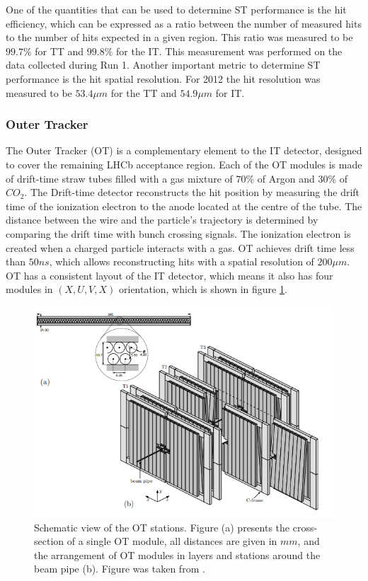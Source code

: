 One of the quantities that can be used to determine ST performance is the hit efficiency, which can be expressed as a ratio between the number of measured hits to the number of hits expected in a given region. This ratio was measured to be $99.7\%$ for TT and $99.8\%$ for the IT. This measurement was performed on the data collected during Run 1. Another important metric to determine ST performance is the hit spatial resolution.  For 2012 the hit resolution was measured to be $53.4 \mu m$ for the TT and $54.9 \mu m$ for IT.  


\subsubsection{Outer Tracker}

 The Outer Tracker (OT) \cite{OT} is a complementary element to the IT detector, designed to cover the remaining LHCb acceptance region. Each of the OT modules is made of drift-time straw tubes filled with a gas mixture of $70\%$ of Argon and $30\%$ of $CO_2$. 
The Drift-time detector reconstructs the hit position by measuring the drift time of the ionization electron to the anode located at the centre of the tube. The distance between the wire and the particle's trajectory is determined by comparing the drift time with bunch crossing signals.  The ionization electron is created when a charged particle interacts with a gas. OT achieves drift time less than $50 ns$, which allows reconstructing hits with a spatial resolution of $200 \mu m$. OT has a consistent layout of the IT detector, which means it also has four modules in  $(X, U, V, X)$ orientation, which is shown in figure \ref{fig:OT}. 


\begin{figure}[!hb]
\centering
\includegraphics[scale=0.7]{figures/OT.PNG}
\caption{Schematic view of the OT stations. Figure (a) presents the cross-section of a single OT module, all distances are given in $mm$, and the arrangement of OT modules in layers and stations around the beam pipe (b).  Figure was taken from \cite{lhcb}.
\label{fig:OT}}
\end{figure}

